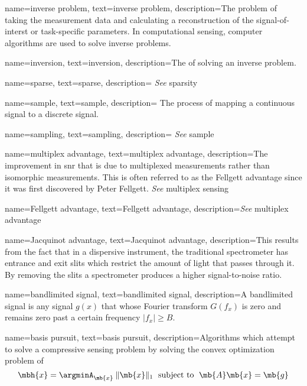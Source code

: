 {
name={inverse problem},
text={inverse problem},
description={The problem of taking the measurement data and calculating a reconstruction of the signal-of-interst or task-specific parameters. In computational sensing, computer algorithms are used to solve inverse problems.}
}

{
name={inversion},
text={inversion},
description={The of solving an \gls{inverse problem}}.
}



{
name={sparse},
text={sparse},
description={ \emph{See} \gls{sparsity}}
}

{
name={sample},
text={sample},
description={ The process of mapping a continuous signal to a discrete signal.  }
}

{
name={sampling},
text={sampling},
description={ \emph{See} \gls{sample}  }
}



{
name={multiplex advantage},
text={multiplex advantage},
description={The improvement in \gls{snr} that is due to multiplexed measurements rather than isomorphic measurements. This is often referred to as the Fellgett advantage since it was first discovered by Peter Fellgett. \emph{See} \gls{multiplex sensing}} 
}

{
name={Fellgett advantage},
text={Fellgett advantage},
description={\emph{See} \gls{multiplex advantage}} 
}

{
name={Jacquinot advantage},
text={Jacquinot advantage},
description={This results from the fact that in a dispersive instrument, the traditional spectrometer has entrance and exit slits which restrict the amount of light that passes through it. By removing the slits a spectrometer produces a higher signal-to-noise ratio.} 
}

{
name={bandlimited signal},
text={bandlimited signal},
description={A bandlimited signal is any signal $ g(x) $ that whose Fourier transform $ G(f_x) $ is zero and remains zero past a certain frequency $ \lvert f_x \rvert \geq B$.} 
}

{
name={basis pursuit},
text={basis pursuit},
description={Algorithms which attempt to solve a compressive sensing problem by solving the convex optimization problem of 
\begin{equation}
	\mbh{x} = \argminA_{\mb{x}} \: \| \mb{x} \|_{1} \text{\; subject to \;} \mb{A}\mb{x} = \mb{g}
\end{equation} 
}
}

